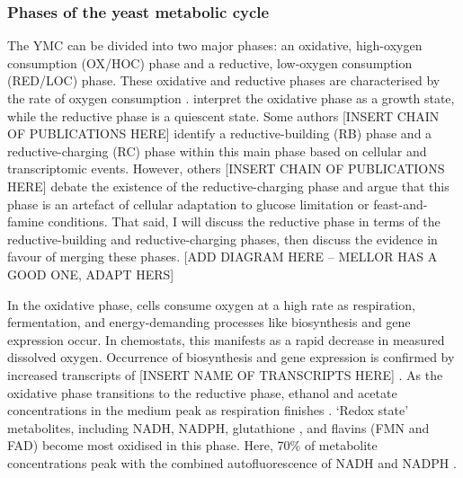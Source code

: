 \subsubsection{Phases of the yeast metabolic cycle}
\label{subsubsec:intro-ymc-definition-phases}

The YMC can be divided into two major phases: an oxidative, high-oxygen consumption (OX/HOC) phase and a reductive, low-oxygen consumption (RED/LOC) phase.
These oxidative and reductive phases are characterised by the rate of oxygen consumption \citep{mellorMolecularBasisMetabolic2016}.
\citet{krishnaMinimalPushPull2018} interpret the oxidative phase as a growth state, while the reductive phase is a quiescent state.
Some authors [INSERT CHAIN OF PUBLICATIONS HERE] identify a reductive-building (RB) phase and a reductive-charging (RC) phase within this main phase based on cellular and transcriptomic events.
However, others [INSERT CHAIN OF PUBLICATIONS HERE] debate the existence of the reductive-charging phase and argue that this phase is an artefact of cellular adaptation to glucose limitation or feast-and-famine conditions.
That said, I will discuss the reductive phase in terms of the reductive-building and reductive-charging phases, then discuss the evidence in favour of merging these phases.
[ADD DIAGRAM HERE -- MELLOR HAS A GOOD ONE, ADAPT HERS]

In the oxidative phase, cells consume oxygen at a high rate as respiration, fermentation, and
energy-demanding processes
like biosynthesis and gene expression occur.
In chemostats, this manifests as a rapid decrease in measured dissolved oxygen.
Occurrence of biosynthesis and gene expression is confirmed by increased transcripts of [INSERT NAME OF TRANSCRIPTS HERE] \parencite{tuLogicYeastMetabolic2005}.
As the oxidative phase transitions to the reductive phase, ethanol and acetate concentrations in the medium peak as respiration finishes \citep{tuLogicYeastMetabolic2005}.
`Redox state' metabolites, including NADH, NADPH, glutathione \citep{lloydUltradianMetronomeTimekeeper2005}, and flavins (FMN and FAD) %
\parencite{murrayRedoxRegulationRespiring2011} become most oxidised in this phase.
Here, 70\% of metabolite concentrations peak with the combined autofluorescence of NADH and NADPH \citep{murrayRegulationYeastOscillatory2007}.

